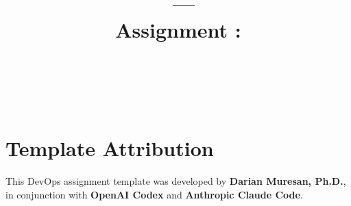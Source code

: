 \title{\CourseNumber\ --- \CourseName\\[0.5em]\large Assignment \AssignmentNumber: \AssignmentTitle\\[1.5em]\normalsize\VERSION\\\DocumentStatus}
\author{\StudentName\\\Organization}
\conferraldate{}{\DocumentDate}
\copyrightholder{\Organization}
\maketitle
\makecopyright

\cleardoublepage
{}
\chapter*{Template Attribution}
This DevOps assignment template was developed by \textbf{Darian Muresan, Ph.D.},
in conjunction with \textbf{OpenAI Codex} and \textbf{Anthropic Claude Code}.

\clearpage
\begin{abstract}\end{abstract}

\contentspage
\tablelistpage
\figurelistpage
